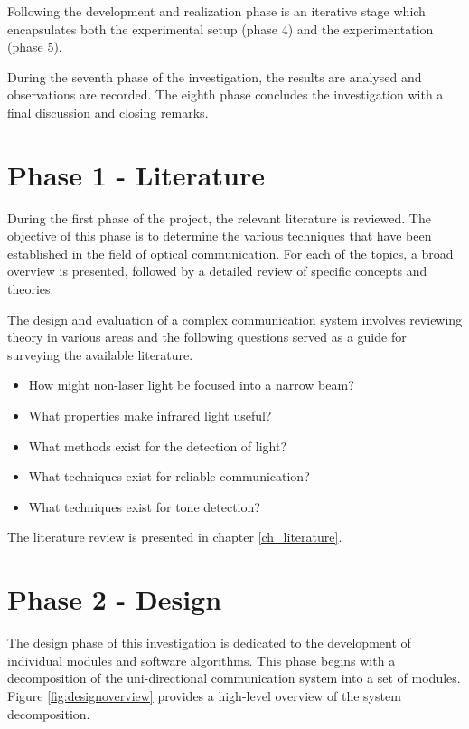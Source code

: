 Following the development and realization phase is an iterative stage which encapsulates both the experimental setup (phase 4) and the experimentation (phase 5).

During the seventh phase of the investigation, the results are analysed and observations are recorded. The eighth phase concludes the investigation with a final discussion and closing remarks.


\section{Phase 1 - Literature}

During the first phase of the project, the relevant literature is reviewed. The objective of this phase is to determine the various techniques that have been established in the field of optical communication. For each of the topics, a broad overview is presented, followed by a detailed review of specific concepts and theories.

The design and evaluation of a complex communication system involves reviewing theory in various areas and the following questions served as a guide for surveying the available literature.

\begin{itemize}
	\item How might non-laser light be focused into a narrow beam? %
	\item What properties make infrared light useful? %
	\item What methods exist for the detection of light? %
	\item What techniques exist for reliable communication? %
	\item What techniques exist for tone detection? %
\end{itemize}

The literature review is presented in chapter \ref{ch_literature}.


\section{Phase 2 - Design}

The design phase of this investigation is dedicated to the development of individual modules and software algorithms. This phase begins with a decomposition of the uni-directional communication system into a set of modules. Figure \ref{fig:designoverview} provides a high-level overview of the system decomposition.

